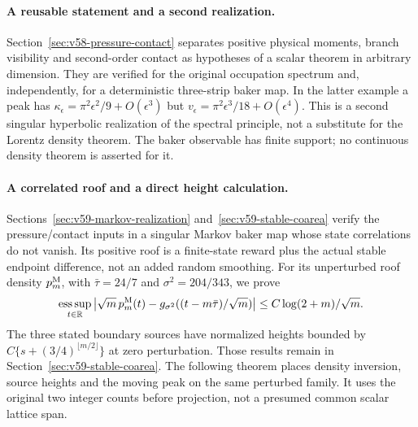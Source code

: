 \paragraph{A reusable statement and a second realization.}
Section~\ref{sec:v58-pressure-contact} separates positive physical
moments, branch visibility and second-order contact as hypotheses of
a scalar theorem in arbitrary dimension. They are verified for the
original occupation spectrum and, independently, for a deterministic
three-strip baker map. In the latter example a peak has
$\kappa_\epsilon=\pi^2\epsilon^2/9+O(\epsilon^3)$ but
$v_\epsilon=\pi^2\epsilon^3/18+O(\epsilon^4)$. This is a second
singular hyperbolic realization of the spectral principle, not a
substitute for the Lorentz density theorem. The baker observable has
finite support; no continuous density theorem is asserted for it.

\paragraph{A correlated roof and a direct height calculation.}
Sections~\ref{sec:v59-markov-realization} and~\ref{sec:v59-stable-coarea}
verify the pressure/contact inputs in a singular Markov baker map whose
state correlations do not vanish. Its positive roof is a finite-state
reward plus the actual stable endpoint difference, not an added random
smoothing. For its unperturbed roof density $p_m^{\rm M}$, with
$\bar\tau=24/7$ and $\sigma^2=204/343$, we prove
\[
 \operatorname*{ess\,sup}_{t\in\mathbb R}
 \left|\sqrt m\,p_m^{\rm M}(t)
       -g_{\sigma^2}((t-m\bar\tau)/\sqrt m)\right|
                 \le C\log(2+m)/\sqrt m.
\]
The three stated boundary sources have normalized heights bounded by
$C\{s+(3/4)^{\lfloor m/2\rfloor}\}$ at zero perturbation. Those results
remain in Section~\ref{sec:v59-stable-coarea}. The following theorem
places density inversion, source heights and the moving peak on the
same perturbed family. It uses the original two integer counts before
projection, not a presumed common scalar lattice span.

